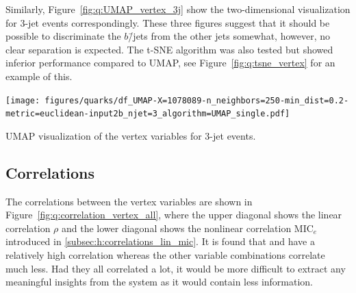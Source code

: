 Similarly, Figure~\ref{fig:q:UMAP_vertex_3j} 
show the two-dimensional visualization for 3-jet events correspondingly. These three figures suggest that it should be possible to discriminate the $b$\=/jets from the other jets somewhat, however, no clear separation is expected. The t-SNE algorithm was also tested but showed inferior performance compared to UMAP, see Figure~\ref{fig:q:tsne_vertex} for an example of this.

\begin{marginfigure}
  \centerfloat
  \texttt{[image: figures/quarks/df\_UMAP-X=1078089-n\_neighbors=250-min\_dist=0.2-metric=euclidean-input2b\_njet=3\_algorithm=UMAP\_single.pdf]}
  \vspace{1mm}
  \caption[UMAP Visualization of the Vertex Variables for 3-Jet Events]
          {UMAP visualization of the vertex variables for 3-jet events.} 
  \label{fig:q:UMAP_vertex_3j}
\end{marginfigure}




\subsection{Correlations}

The correlations between the vertex variables are shown in Figure~\ref{fig:q:correlation_vertex_all}, where the upper diagonal shows the linear correlation $\rho$ and the lower diagonal shows the nonlinear correlation $\mathrm{MIC}_e$ introduced in \autoref{subsec:h:correlations_lin_mic}. It is found that  and  have a relatively high correlation whereas the other variable combinations correlate much less. Had they all correlated a lot, it would be more difficult to extract any meaningful insights from the system as it would contain less information. 

